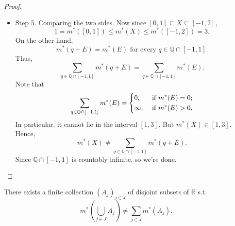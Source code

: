 \begin{proof}
\begin{itemize}
        \[
            (q + E) \cap (q^{\prime} + E) \neq \varnothing.
        \] 
        Then, there exists cosets \(A, A^{\prime} \in \mathbb{R} / \mathbb{Q} \) s.t. 
        \[
            q + x_A = q^{\prime} + x_{A^{\prime} }.
        \] 
        Hence,
        \[
             x_{A^{\prime} } - x_A = q - q^{\prime} \in \mathbb{Q}.
        \]
        Now since \(x_A \in A = x_A + \mathbb{Q} \) and \(x_{A^{\prime} } \in A^{\prime} = x_{A^{\prime} } + \mathbb{Q} \), so \(A = A^{\prime}\). But \(E\) contains exactly one representative from each coset, which means \(x_A = x_{A^{\prime}}\). Thus, \(q = q^{\prime}\), which contradicts to the assumption, so the sets \(q + E\) are pairwise disjoint.
        \item Step 5. Comparing the two sides. Now since \([0, 1] \subseteq X \subseteq [-1, 2]\), 
        \[
            1 = m^*([0, 1]) \le m^*(X) \le m^*([-1, 2]) = 3.
        \]
        On the other hand, 
        \[
            m^*(q + E) = m^*(E) \text{ for every } q \in \mathbb{Q} \cap [-1, 1]. 
        \]
        Thus,
        \[
            \sum_{q \in \mathbb{Q} \cap [-1, 1]} m^*(q + E) = \sum_{q \in \mathbb{Q} \cap [-1, 1]} m^*(E).  
        \]
        Note that 
        \[
            \sum_{q \in \mathbb{Q} \cap [-1, 1]} m^*(E) = \begin{dcases}
                0, &\text{ if } m^*(E) = 0;\\
                \infty , &\text{ if } m^*(E) > 0.
            \end{dcases} 
        \]
        In particular, it cannot lie in the interval \([1, 3]\). But \(m^*(X) \in [1, 3]\). Hence,
        \[
            m^*(X) \neq \sum_{q \in \mathbb{Q} \cap [-1, 1]} m^*(q + E).
        \]  
        Since \(\mathbb{Q} \cap [-1, 1]\) is countably infinite, so we're done. 
    \end{itemize}  
\end{proof}

\begin{proposition}
    There exists a finite collection \((A_j)_{j \in J}\) of disjoint subsets of \(\mathbb{R} \) s.t. 
    \[
        m^* \left( \bigcup_{j \in J} A_j  \right) \neq \sum_{j \in J} m^*(A_j). 
    \]  
\end{proposition}

